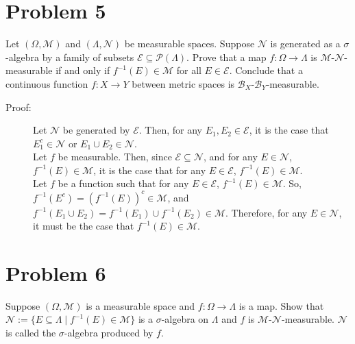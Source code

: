 \documentclass[10pt]{extarticle}
\begin{document}
  \section{Problem 5}%
  Let $(\Omega,\mathcal{M})$ and $(\Lambda,\mathcal{N})$ be measurable spaces. Suppose $\mathcal{N}$ is generated as a $\sigma$-algebra by a family of subsets $\mathcal{E}\subseteq \mathcal{P}(\Lambda)$. Prove that a map $f:\Omega \rightarrow \Lambda$ is $\mathcal{M}$-$\mathcal{N}$-measurable if and only if $f^{-1}(E)\in \mathcal{M}$ for all $E\in \mathcal{E}$. Conclude that a continuous function $f: X\rightarrow Y$ between metric spaces is $\mathcal{B}_{X}$-$\mathcal{B}_{Y}$-measurable.
  \begin{description}
    \item[Proof:] Let $\mathcal{N}$ be generated by $\mathcal{E}$. Then, for any $E_1,E_2\in \mathcal{E}$, it is the case that $E_1^{c}\in \mathcal{N}$ or $E_1\cup E_2\in \mathcal{N}$.\\

      Let $f$ be measurable. Then, since $\mathcal{E}\subseteq \mathcal{N}$, and for any $E\in \mathcal{N}$, $f^{-1}(E)\in \mathcal{M}$, it is the case that for any $E\in \mathcal{E}$, $f^{-1}(E)\in \mathcal{M}$.\\

      Let $f$ be a function such that for any $E\in \mathcal{E}$, $f^{-1}(E)\in \mathcal{M}$. So, $f^{-1}(E^{c}) = \left(f^{-1}(E)\right)^c \in \mathcal{M}$, and $f^{-1}(E_1\cup E_2) = f^{-1}(E_1)\cup f^{-1}(E_2) \in \mathcal{M}$. Therefore, for any $E\in \mathcal{N}$, it must be the case that $f^{-1}(E)\in \mathcal{M}$.
  \end{description}
  \section{Problem 6}%
  Suppose $(\Omega,\mathcal{M})$ is a measurable space and $f: \Omega \rightarrow \Lambda$ is a map. Show that $\mathcal{N}:= \{E\subseteq \Lambda\mid f^{-1}(E)\in \mathcal{M}\}$ is a $\sigma$-algebra on $\Lambda$ and $f$ is $\mathcal{M}$-$\mathcal{N}$-measurable. $\mathcal{N}$ is called the $\sigma$-algebra produced by $f$.
\end{document}
